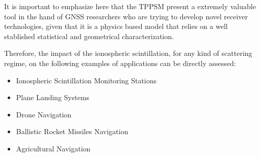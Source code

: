 It is important to emphasize here that the TPPSM present a extremely valuable tool in the hand of GNSS researchers who are trying to develop novel receiver technologies, given that it is a physics based model that relies on a well stablished statistical and geometrical characterization.

Therefore, the impact of the ionospheric scintillation, for any kind of scattering regime, on the following examples of applications can be directly assessed:

\begin{itemize}
    \item Ionospheric Scintillation Monitoring Stations
    \item Plane Landing Systems
    \item Drone Navigation
    \item Ballistic Rocket Missiles Navigation
    \item Agricultural Navigation
\end{itemize}